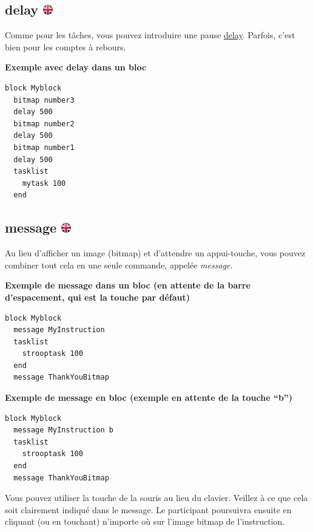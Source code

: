 \documentclass[
]{book}
\begin{document}
\hypertarget{delay-1}{%
\subsection[delay ]{\texorpdfstring{delay \href{https://www.psytoolkit.org/doc3.4.0/syntax.html\#block-delay}{\protect\includegraphics{img/ukflag.png}}}{delay }}\label{delay-1}}

Comme pour les tâches, vous pouvez introduire une pause \protect\hyperlink{delay}{delay}. Parfois, c'est bien pour les comptes à rebours.

\textbf{Exemple avec delay dans un bloc}

\begin{verbatim}
block Myblock
  bitmap number3
  delay 500
  bitmap number2
  delay 500
  bitmap number1
  delay 500
  tasklist
    mytask 100
  end
\end{verbatim}

\hypertarget{message}{%
\subsection[message ]{\texorpdfstring{message \href{https://www.psytoolkit.org/doc3.4.0/syntax.html\#block-message}{\protect\includegraphics{img/ukflag.png}}}{message }}\label{message}}

Au lieu d'afficher un image (bitmap) et d'attendre un appui-touche, vous pouvez combiner tout cela en une seule commande, appelée \emph{message}.

\textbf{Exemple de message dans un bloc (en attente de la barre d'espacement, qui est la touche par défaut)}

\begin{verbatim}
block Myblock
  message MyInstruction
  tasklist
    strooptask 100
  end
  message ThankYouBitmap
\end{verbatim}

\textbf{Exemple de message en bloc (exemple en attente de la touche ``b'')}

\begin{verbatim}
block Myblock
  message MyInstruction b
  tasklist
    strooptask 100
  end
  message ThankYouBitmap
\end{verbatim}

Vous pouvez utiliser la touche de la souris au lieu du clavier. Veillez à ce que cela soit clairement indiqué dans le message. Le participant poursuivra ensuite en cliquant (ou en touchant) n'importe où sur l'image bitmap de l'instruction.
\end{document}
